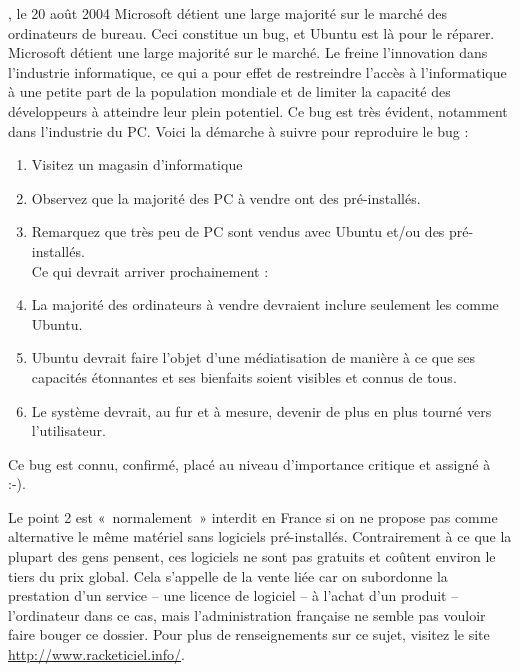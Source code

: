 \begin{citationlongue}{, le 20 août 2004}
Microsoft détient une large majorité sur le marché des ordinateurs de bureau. Ceci constitue un bug, et Ubuntu est là pour le réparer.\\
Microsoft détient une large majorité sur le marché. Le  freine l'innovation dans l'industrie informatique, ce qui a pour effet de restreindre l'accès à l'informatique à une petite part de la population mondiale et de limiter la capacité des développeurs à atteindre leur plein potentiel. Ce bug est très évident, notamment dans l'industrie du PC.
Voici la démarche à suivre pour reproduire le bug :
\begin{enumerate}
\item Visitez un magasin d'informatique
\item Observez que la majorité des PC à vendre ont des  pré-installés.
\item Remarquez que très peu de PC sont vendus avec Ubuntu et/ou des  pré-installés.\\
Ce qui devrait arriver prochainement :
\item La majorité des ordinateurs à vendre devraient inclure seulement les  comme Ubuntu.
\item Ubuntu devrait faire l'objet d'une médiatisation de manière à ce que ses capacités étonnantes et ses bienfaits soient visibles et connus de tous.
\item Le système devrait, au fur et à mesure, devenir de plus en plus tourné vers l'utilisateur.
\end{enumerate}
\end{citationlongue}
Ce bug est connu, confirmé, placé au niveau d'importance critique et assigné à  :-).\par
\begin{nota}
Le point 2 est «~normalement~» interdit en France si on ne propose pas comme alternative le même matériel sans logiciels pré-installés. Contrairement à ce que la plupart des gens pensent, ces logiciels ne sont pas gratuits et coûtent environ le tiers du prix global. Cela s'appelle de la vente liée car on subordonne la prestation d'un service -- une licence de logiciel -- à l'achat d'un produit -- l'ordinateur dans ce cas, mais l'administration française ne semble pas vouloir faire bouger ce dossier. Pour plus de renseignements sur ce sujet, visitez le site \url{http://www.racketiciel.info/}.
\end{nota}
